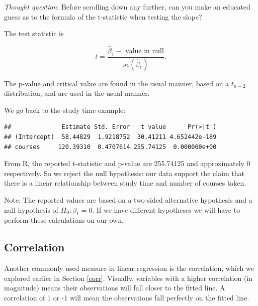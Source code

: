 \documentclass[
]{book}
\newenvironment{Shaded}{\begin{snugshade}}{\end{snugshade}}
\newcommand{\DocumentationTok}[1]{\textcolor[rgb]{0.56,0.35,0.01}{\textbf{\textit{#1}}}}
\newcommand{\FunctionTok}[1]{\textcolor[rgb]{0.13,0.29,0.53}{\textbf{#1}}}
\newcommand{\NormalTok}[1]{#1}
\newcommand{\SpecialCharTok}[1]{\textcolor[rgb]{0.81,0.36,0.00}{\textbf{#1}}}
\begin{document}
\emph{Thought question}: Before scrolling down any further, can you make an educated guess as to the formula of the t-statistic when testing the slope?

The test statistic is

\begin{equation} 
t = \frac{\hat{\beta}_1 - \text{ value in null}}{se(\hat{\beta}_1)}.
\label{eq:10-testslope}
\end{equation}

The p-value and critical value are found in the usual manner, based on a \(t_{n-2}\) distribution, and are used in the usual manner.

We go back to the study time example:

\begin{Shaded}
\end{Shaded}

\begin{verbatim}
##              Estimate Std. Error   t value      Pr(>|t|)
## (Intercept)  58.44829  1.9218752  30.41211 4.652442e-189
## courses     120.39310  0.4707614 255.74125  0.000000e+00
\end{verbatim}

From R, the reported t-statistic and p-value are 255.74125 and approximately 0 respectively. So we reject the null hypothesis: our data support the claim that there is a linear relationship between study time and number of courses taken.

Note: The reported values are based on a two-sided alternative hypothesis and a null hypothesis of \(H_0: \beta_1 = 0\). If we have different hypotheses we will have to perform these calculations on our own.

\subsection{Correlation}\label{correlation}

Another commonly used measure in linear regression is the correlation, which we explored earlier in Section \ref{corr}. Visually, variables with a higher correlation (in magnitude) means their observations will fall closer to the fitted line. A correlation of 1 or -1 will mean the observations fall perfectly on the fitted line.
\end{document}
